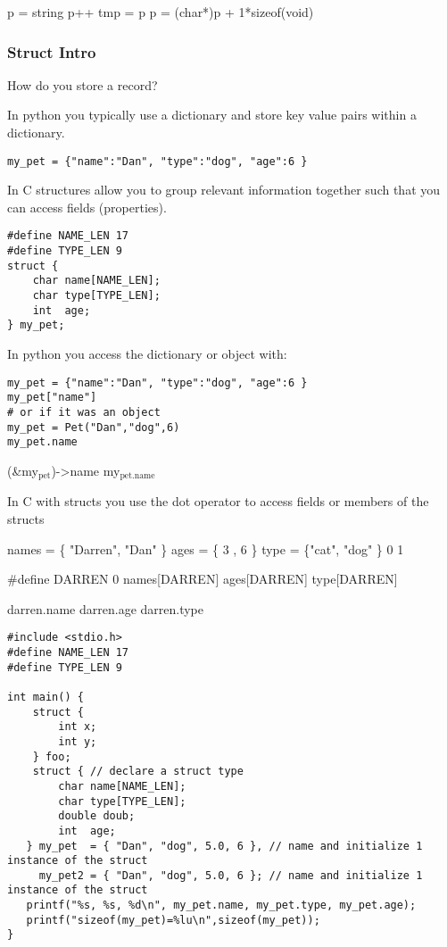 \documentclass[11pt]{article}
\begin{document}
p = string
p++
tmp = p
p = (char*)p + 1*sizeof(void)


\subsubsection{Struct Intro}
\label{sec:org17b78ea}
How do you store a record?

In python you typically use a dictionary and store key value pairs
within a dictionary.

\begin{verbatim}
my_pet = {"name":"Dan", "type":"dog", "age":6 }
\end{verbatim}

In C structures allow you to group relevant information together such
that you can access fields (properties).

\begin{verbatim}
#define NAME_LEN 17
#define TYPE_LEN 9
struct {
    char name[NAME_LEN];
    char type[TYPE_LEN];
    int  age;
} my_pet;
\end{verbatim}

In python you access the dictionary or object with:
\begin{verbatim}
my_pet = {"name":"Dan", "type":"dog", "age":6 }
my_pet["name"]
# or if it was an object
my_pet = Pet("Dan","dog",6)
my_pet.name
\end{verbatim}

(\&my\(_{\text{pet}}\))->name
my\(_{\text{pet.name}}\)

In C with structs you use the dot operator to access fields or members
of the structs

names = \{ "Darren", "Dan" \}
ages  = \{ 3       , 6 \}
type  = \{"cat",     "dog" \}
          0           1

\#define DARREN 0
names[DARREN]
ages[DARREN]
type[DARREN]

darren.name
darren.age
darren.type


\begin{verbatim}
#include <stdio.h>
#define NAME_LEN 17
#define TYPE_LEN 9

int main() {
    struct { 
        int x;
        int y;
    } foo;
    struct { // declare a struct type
        char name[NAME_LEN];
        char type[TYPE_LEN];
        double doub;
        int  age;
   } my_pet  = { "Dan", "dog", 5.0, 6 }, // name and initialize 1 instance of the struct
     my_pet2 = { "Dan", "dog", 5.0, 6 }; // name and initialize 1 instance of the struct
   printf("%s, %s, %d\n", my_pet.name, my_pet.type, my_pet.age);
   printf("sizeof(my_pet)=%lu\n",sizeof(my_pet));
}
\end{verbatim}
\end{document}

